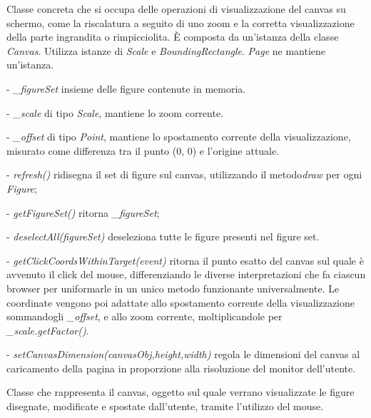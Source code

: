 Classe concreta che si occupa delle operazioni di visualizzazione del canvas su schermo, come la riscalatura a seguito di uno zoom e la corretta visualizzazione della parte ingrandita o rimpicciolita.
\` E composta da un'istanza della classe \textit{Canvas}. Utilizza istanze di \textit{Scale} e \textit{BoundingRectangle}.
\textit{Page} ne mantiene un'istanza.
\begin{elencopuntato}[\subsubsecindent]
\item[-] \textit{{\_}figureSet} insieme delle figure contenute in memoria.
\item[-] \textit{{\_}scale} di tipo \textit{Scale}, mantiene lo zoom corrente.
\item[-] \textit{{\_}offset} di tipo \textit{Point}, mantiene lo spostamento corrente della visualizzazione, misurato come differenza tra il punto (0, 0) e l'origine attuale.
\end{elencopuntato}
\begin{elencopuntato}[\subsubsecindent]
\item[-] \textit{refresh()} ridisegna il set di figure sul canvas, utilizzando il metodo\textit{draw} per ogni \textit{Figure};
\item[-] \textit{getFigureSet()} ritorna \textit{{\_}figureSet};
\item[-] \textit{deselectAll(figureSet)} deseleziona tutte le figure presenti nel figure set.
\item[-] \textit{getClickCoordsWithinTarget(event)} ritorna il punto esatto del canvas sul quale \`  e avvenuto il click  del mouse, differenziando le diverse interpretazioni che fa ciascun browser per uniformarle in un unico metodo funzionante universalmente.
Le coordinate vengono poi adattate allo spostamento corrente della visualizzazione sommandogli \textit{{\_}offset}, e allo zoom corrente, moltiplicandole per \textit{{\_}scale.getFactor()}.
\item[-] \textit{setCanvasDimension(canvasObj,height,width)} regola le dimensioni del canvas al caricamento della pagina in proporzione alla risoluzione del monitor dell'utente.
\end{elencopuntato}

Classe che rappresenta il canvas, oggetto sul quale verrano visualizzate le figure disegnate, modificate e spostate dall'utente, tramite l'utilizzo del mouse. 

